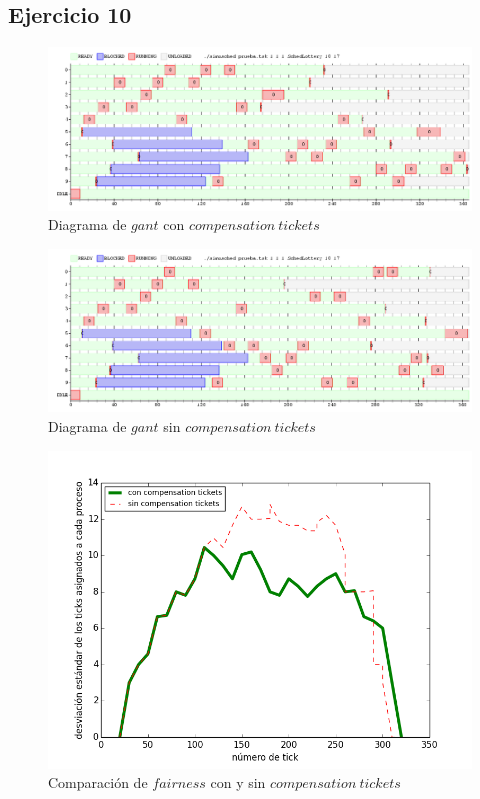 \documentclass[a4paper]{article}
\begin{document}
\newpage
\subsection{Ejercicio 10}

\begin{figure}[H]
\centering
\includegraphics[scale=0.5]{../experimentacion/ej10-compensation/gant-sin.png}
\caption{Diagrama de $gant$ con $compensation\ tickets$}
\end{figure}

\begin{figure}[H]
\centering
\includegraphics[scale=0.5]{../experimentacion/ej10-compensation/gant-con.png}
\caption{Diagrama de $gant$ sin $compensation\ tickets$}
\end{figure}

\begin{figure}[H]
\centering
\includegraphics[scale=0.66]{../experimentacion/ej10-compensation/plot-comparativa.png}
\caption{Comparación de $fairness$ con y sin $compensation\ tickets$}
\end{figure}
\end{document}
